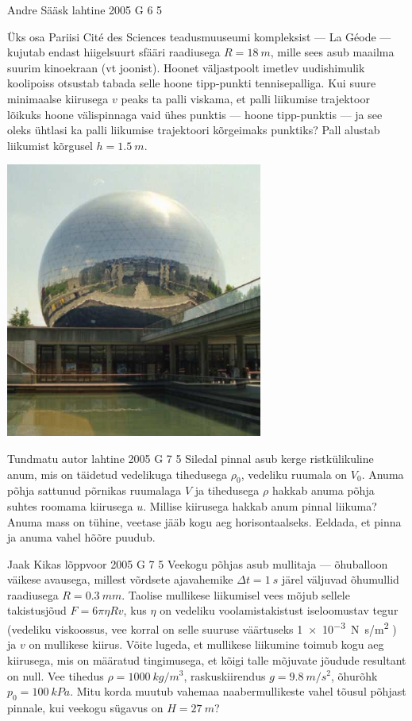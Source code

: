 \documentclass[11pt, twoside]{article}
\begin{document}
{%
{Andre Sääsk} %
{lahtine} %
{2005} %
{G 6} %
{5} %
{
\ifStatement
Üks osa Pariisi Cité des Sciences teadusmuuseumi kompleksist --- La Géode --- kujutab endast hiigelsuurt sfääri raadiusega $R = \SI{18}{m}$, mille sees asub maailma suurim kinoekraan (vt joonist). Hoonet väljastpoolt imetlev uudishimulik koolipoiss otsustab tabada selle hoone tipp-punkti tennisepalliga. Kui suure minimaalse kiirusega $v$ peaks ta palli viskama, et palli liikumise trajektoor lõikuks hoone välispinnaga vaid ühes punktis --- hoone tipp-punktis --- ja see oleks ühtlasi ka palli liikumise trajektoori kõrgeimaks punktiks? Pall alustab liikumist kõrgusel $h = \SI{1,5}{m}$.

\begin{center}
	\includegraphics[width=0.5\linewidth]{2005-lahg-06-yl}
\end{center}
\fi
}

{Tundmatu autor} %
{lahtine} %
{2005} %
{G 7} %
{5} %
{
\ifStatement
Siledal pinnal asub kerge ristkülikuline anum, mis on täidetud vedelikuga tihedusega $\rho_0$, vedeliku ruumala on $V_0$. Anuma põhja sattunud põrnikas ruumalaga $V$ ja tihedusega $\rho$ hakkab anuma põhja suhtes roomama kiirusega $u$. Millise kiirusega hakkab anum pinnal liikuma? Anuma mass on tühine, veetase jääb kogu aeg horisontaalseks. Eeldada, et pinna ja anuma vahel hõõre puudub.
\fi
}

{Jaak Kikas} %
{lõppvoor} %
{2005} %
{G 7} %
{5} %
{
\ifStatement
Veekogu põhjas asub mullitaja --- õhuballoon väikese avausega, millest võrdsete ajavahemike $\Delta t = \SI{1}{s}$ järel väljuvad õhumullid raadiusega $R = \SI{0,3}{mm}$. Taolise mullikese liikumisel vees mõjub sellele takistusjõud $F = 6\pi \eta Rv$, kus $\eta$ on vedeliku voolamistakistust iseloomustav tegur (vedeliku viskoossus, vee korral on selle suuruse väärtuseks \SI{1e-3}{N.s/m^2} ) ja $v$ on mullikese kiirus. Võite lugeda, et mullikese liikumine toimub kogu aeg kiirusega, mis on määratud tingimusega, et kõigi talle mõjuvate jõudude resultant on null. Vee tihedus $\rho = \SI{1000}{kg/m^3}$, raskuskiirendus $g = \SI{9,8}{m/s^2}$, õhurõhk $p_0 = \SI{100}{kPa}$. Mitu korda muutub vahemaa naabermullikeste vahel tõusul põhjast pinnale, kui veekogu sügavus on $H = \SI{27}{m}$?
\fi
}

}
\end{document}
